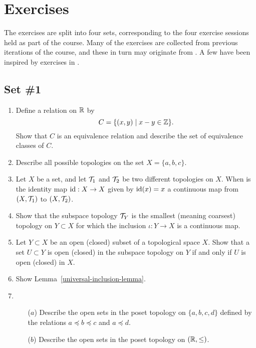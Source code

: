 \section{Exercises}
The exercises are split into four sets, corresponding to the four exercise sessions held as part of the course. Many of the exercises are collected from previous iterations of the course, and these in turn may originate from \cite{Mun}. A few have been inspired by exercises in \cite{DM}.

\subsection{Set \#1}

\begin{enumerate}
  \item Define a relation on $\mathbb{R}$ by
    \[
      C=\{(x,y) \mid x - y \in \mathbb{Z} \}.
    \]
    Show that $C$ is an equivalence relation and describe the set of equivalence classes of $C$.
  \item Describe all possible topologies on the set $X = \{a,b,c\}$.
  \item Let $X$ be a set, and let $\mathcal{T}_1$ and $\mathcal{T}_2$ be two different topologies on $X$. When is the identity map $\mathrm{id} : X \to X$ given by $\mathrm{id}(x) = x$ a continuous map from $(X,\mathcal{T}_1)$ to $(X,\mathcal{T}_2)$.
  \item
		Show that the subspace topology $\mathcal{T}_Y$ is the smallest (meaning coarsest) topology on $Y\subset X$ for which the inclusion $\iota:Y \rightarrow X$ is a continuous map.
	
	\item \label{opens-in-opens} Let $Y\subset X$ be an open (closed) subset of a topological space $X$. Show that a set $U \subset Y$ is open (closed) in the subspace topology on $Y$ if and only if $U$ is open (closed) in $X$.
	
	\item \label{universal-inclusion} Show Lemma~\ref{universal-inclusion-lemma}.
	
  \item \begin{itemize}
		\item[($a$)] Describe the open sets in the poset topology on $\{a,b,c,d\}$ defined by the relations $a\preceq b\preceq c$ and $a\preceq d$.
		\item[($b$)] Describe the open sets in the poset topology on $(\mathbb{R},\leq)$.
	\end{itemize}
	

\end{enumerate}
